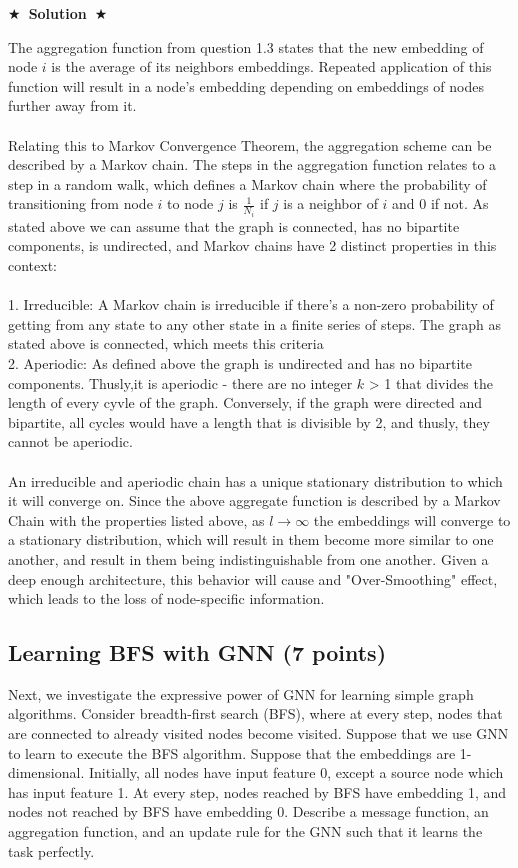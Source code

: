 \documentclass{article}
\numberwithin{figure}{section}
\newcommand{\Solution}[1]{{\medskip \color{red} \bf $\bigstar$~\sf \textbf{Solution}~$\bigstar$ \sf #1 } \bigskip}
\begin{document}
\Solution{

The aggregation function from question 1.3 states that the new embedding of node $i$ is the average of its neighbors embeddings. Repeated application of this function will result in a node's embedding depending on embeddings of nodes further away from it.\\\\
Relating this to Markov Convergence Theorem, the aggregation scheme can be described by a Markov chain. The steps in the aggregation function relates to a step in a random walk, which defines a Markov chain where the probability of transitioning from node $i$ to node $j$ is $\frac{1}{N_i}$ if $j$ is a neighbor of $i$ and 0 if not. As stated above we can assume that the graph is connected, has no bipartite components, is undirected, and Markov chains have 2 distinct properties in this context:
\\
\\
1. Irreducible: A Markov chain is irreducible if there's a non-zero probability of getting from any state to any other state in a finite series of steps. The graph as stated above is connected, which meets this criteria
\\
2. Aperiodic: As defined above the graph is undirected and has no bipartite components. Thusly,it is aperiodic - there are no integer $k$ > 1 that divides the length of every cyvle of the graph. Conversely, if the graph were directed and bipartite, all cycles would have a length that is divisible by 2, and thusly, they cannot be aperiodic.
\\\\
An irreducible and aperiodic chain has a unique stationary distribution to which it will converge on. Since the above aggregate function is described by a Markov Chain with the properties listed above, as $l \rightarrow \infty$ the embeddings will converge to a stationary distribution, which will result in them become more similar to one another, and result in them being indistinguishable from one another. Given a deep enough architecture, this behavior will cause and "Over-Smoothing" effect, which leads to the loss of node-specific information.

}


\subsection{Learning BFS with GNN (7 points)}

Next, we investigate the expressive power of GNN for learning simple graph algorithms. Consider breadth-first search (BFS), where at every step, nodes that are connected to already visited nodes become visited. Suppose that we use GNN to learn to execute the BFS algorithm. Suppose that the embeddings are 1-dimensional. Initially, all nodes have input feature 0, except a source node which has input feature 1. At every step, nodes reached by BFS have embedding 1, and nodes not reached by BFS have embedding 0. Describe a message function, an aggregation function, and an update rule for the GNN such that it learns the task perfectly.
\end{document}
